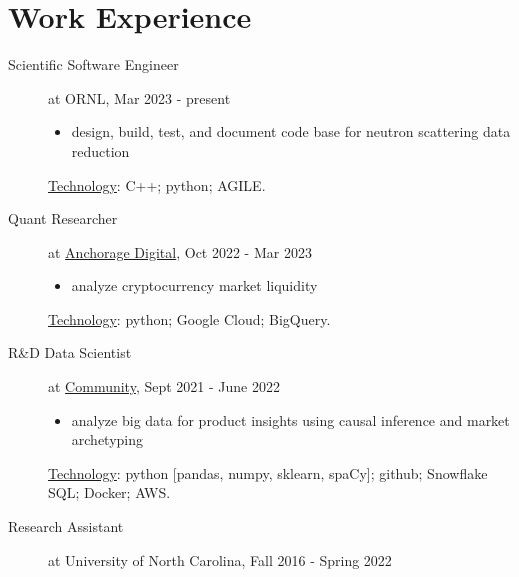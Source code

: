 \documentclass[11pt, letter]{article}
\begin{document}
\section*{Work Experience}
\begin{minipage}{\textwidth}
	\begin{description}
	\item[Scientific Software Engineer] at ORNL, Mar 2023 - present
		\vspace{-0.5\baselineskip}
		\begin{itemize}
			\item design, build, test, and document code base for neutron scattering data reduction
		\end{itemize}
		\vspace{-0.5\baselineskip}
		\underline{Technology}: C++; python; AGILE.
	\item[Quant Researcher] at \href{https://www.anchorage.com}{Anchorage Digital}, Oct 2022 - Mar 2023
		\vspace{-0.5\baselineskip}
		\begin{itemize}
			\item analyze cryptocurrency market liquidity
		\end{itemize}
		\vspace{-0.5\baselineskip}
		\underline{Technology}: python; Google Cloud; BigQuery.
	\item[R\&D Data Scientist] at \href{https://www.community.com/about-us}{Community}, Sept 2021 - June 2022
		\vspace{-0.5\baselineskip}
		\begin{itemize}
			\item analyze big data for product insights using causal inference and market archetyping%
		\end{itemize}
		\vspace{-0.5\baselineskip}
		\underline{Technology}: python [pandas, numpy, sklearn, spaCy]; github; Snowflake SQL; Docker; AWS.
	\item[Research Assistant] at University of North Carolina, Fall 2016 - Spring 2022
		\vspace{-0.5\baselineskip}
		\begin{itemize}

\end{itemize}
\end{description}
\end{minipage}
\end{document}
